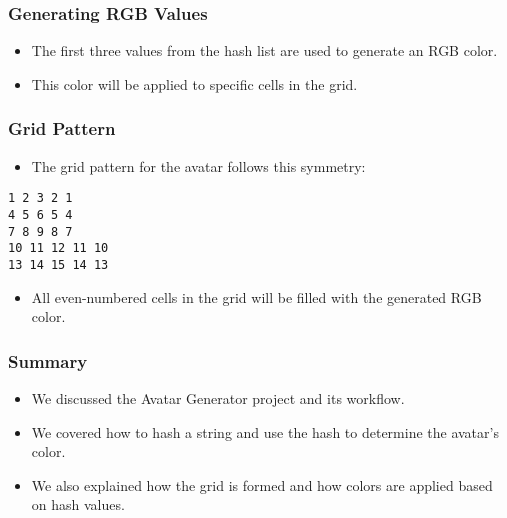 \documentclass[aspectratio=169, table]{beamer}
\begin{document}
	\begin{frame}
		\frametitle{Generating RGB Values}
		\begin{itemize}
			\item The first three values from the hash list are used to generate an RGB color.
			\item This color will be applied to specific cells in the grid.
		\end{itemize}
	\end{frame}
	
	\begin{frame}
		\frametitle{Grid Pattern}
		\begin{itemize}
			\item The grid pattern for the avatar follows this symmetry:
		\end{itemize}
		\begin{center}
			\texttt{1 2 3 2 1} \\
			\texttt{4 5 6 5 4} \\
			\texttt{7 8 9 8 7} \\
			\texttt{10 11 12 11 10} \\
			\texttt{13 14 15 14 13}
		\end{center}
		\begin{itemize}
			\item All even-numbered cells in the grid will be filled with the generated RGB color.
		\end{itemize}
	\end{frame}
	
	\begin{frame}
		\frametitle{Summary}
		\begin{itemize}
			\item We discussed the Avatar Generator project and its workflow.
			\item We covered how to hash a string and use the hash to determine the avatar's color.
			\item We also explained how the grid is formed and how colors are applied based on hash values.
		\end{itemize}
	\end{frame}
	
\end{document}
